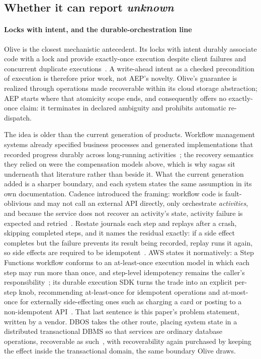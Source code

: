 \subsection{Whether it can report \emph{unknown}}

\paragraph{Locks with intent, and the durable-orchestration line} Olive is the
closest mechanistic antecedent. Its locks with intent durably associate code with
a lock and provide exactly-once execution despite client failures and concurrent
duplicate executions~\cite{setty2016olive}. A write-ahead intent as a checked
precondition of execution is therefore prior work, not AEP's novelty. Olive's
guarantee is realized through operations made recoverable within its cloud
storage abstraction; AEP starts where that atomicity scope ends, and consequently
offers no exactly-once claim: it terminates in declared ambiguity and
prohibits automatic re-dispatch.

The idea is older than the current generation of products. Workflow management
systems already specified business processes and generated implementations that
recorded progress durably across long-running
activities~\cite{georgakopoulos1995workflow}; the recovery semantics they relied
on were the compensation models above, which is why sagas sit underneath that
literature rather than beside it. What the current generation added is a sharper
boundary, and each system states the same assumption in its own documentation.
Cadence introduced the framing: workflow code is fault-oblivious and may not call
an external API directly, only orchestrate \emph{activities}, and because the
service does not recover an activity's state, activity failure is expected and
retried~\cite{cadence-workflows}. Restate journals each step and replays after a
crash, skipping completed steps, and it names the residual exactly: if a side
effect completes but the failure prevents its result being recorded, replay runs
it again, so side effects are required to be
idempotent~\cite{restate-durable-execution}. AWS states it normatively: a Step
Functions workflow conforms to an at-least-once execution model in which each
step may run more than once, and step-level idempotency remains the caller's
responsibility~\cite{aws-stepfunctions-bestpractices}; its durable execution SDK
turns the trade into an explicit per-step knob, recommending at-least-once for
idempotent operations and at-most-once for externally side-effecting ones such as
charging a card or posting to a non-idempotent
API~\cite{aws-durable-execution-idempotency}. That last sentence is this paper's
problem statement, written by a vendor. DBOS takes the other route, placing
system state in a distributed transactional DBMS so that services are ordinary
database operations, recoverable as such~\cite{skiadopoulos2022dbos}, with
recoverability again purchased by keeping the effect inside the transactional
domain, the same boundary Olive draws.

